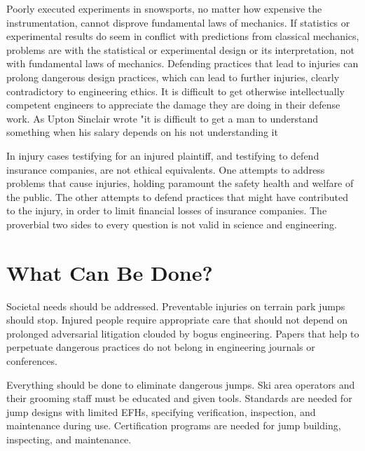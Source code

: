 \documentclass[smallextended]{svjour3}       %
\begin{document}
Poorly executed experiments in snowsports, no matter how expensive the
instrumentation, cannot disprove fundamental laws of mechanics. If statistics
or experimental results do seem in conflict with predictions from classical
mechanics, problems are with the statistical or experimental design or its
interpretation, not with fundamental laws of mechanics. Defending practices
that lead to injuries can prolong dangerous design practices, which can lead to
further injuries, clearly contradictory to engineering ethics. It is difficult
to get otherwise intellectually competent engineers to appreciate the damage
they are doing in their defense work.  As Upton Sinclair wrote "it is difficult
to get a man to understand something when his salary depends on his not
understanding it \cite{Sinclair1994}

In injury cases testifying for an injured plaintiff, and testifying to defend
insurance companies, are not ethical equivalents. One attempts to address
problems that cause injuries, holding paramount the safety health and welfare
of the public. The other attempts to defend practices that might have
contributed to the injury, in order to limit financial losses of insurance
companies. The proverbial two sides to every question is not valid in science
and engineering.

\section{What Can Be Done?}
\label{sec:action}
%
Societal needs should be addressed. Preventable injuries on terrain park jumps
should stop. Injured people require appropriate care that should not depend on
prolonged adversarial litigation clouded by bogus engineering. Papers that help
to perpetuate dangerous practices do not belong in engineering journals or
conferences.

Everything should be done to eliminate dangerous jumps.  Ski area operators and
their grooming staff must be educated and given tools. Standards are needed for
jump designs with limited EFHs, specifying verification, inspection, and
maintenance during use. Certification programs are needed for jump building,
inspecting, and maintenance.
\end{document}
